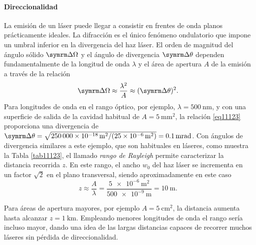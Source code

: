 \paragraph{Direccionalidad} \label{par1123}
La emisión de un láser puede llegar a consistir en frentes de onda planos prácticamente ideales. La difracción es el único fenómeno ondulatorio que impone un umbral inferior en la divergencia del haz láser. El orden de magnitud del ángulo sólido $\del\Omega$ y el ángulo de divergencia $\del\theta$ dependen fundamentalmente de la longitud de onda $\lambda$ y el área de apertura $A$ de la emisión\autocite{Milonni1988Lasers} a través de la relación
\begin{equation}
    \label{eq11123}
    \del\Omega \approx \dfrac{\lambda^2}{A} \approx (\del\theta)^2.
\end{equation}
Para longitudes de onda en el rango óptico, por ejemplo, $\lambda = \qty{500}{\nm}$, y con una superficie de salida de la cavidad habitual de $A = \qty{5}{\mm^2}$, la relación \eqref{eq11123} proporciona una divergencia de $\del\theta = \sqrt{\qty{250000e-18}{\m^2}/(\qty{25e-6}{\m^2})} = \qty{0,1}{\milli\radian}$. Con ángulos de divergencia similares a este ejemplo, que son habituales en láseres, como muestra la Tabla \ref{tab11123}, el llamado \emph{rango de Rayleigh} permite caracterizar la distancia recorrida $z$. En este rango, el ancho $w_0$ del haz láser se incrementa en un factor $\sqrt{2}$ en el plano transversal, siendo aproximadamente en este caso
\begin{equation}
    \label{eq21123}
    z\approx\dfrac{A}{\lambda} = \dfrac{\qty{5e-6}{\m^2}}{\qty{500e-9}{\m}} = \qty{10}{\m}.
\end{equation}

Para áreas de apertura mayores, por ejemplo $A = \qty{5}{\cm^2}$, la distancia aumenta hasta alcanzar $z = \qty{1}{\km}$. Empleando menores longitudes de onda el rango sería incluso mayor, dando una idea de las largas distancias capaces de recorrer muchos láseres sin pérdida de direccionalidad.

